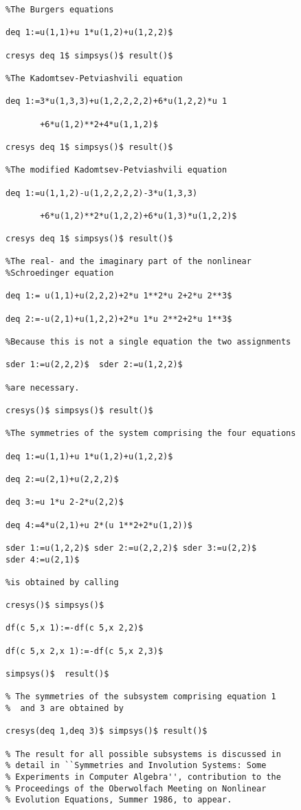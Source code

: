 \begin{verbatim}
%The Burgers equations

deq 1:=u(1,1)+u 1*u(1,2)+u(1,2,2)$

cresys deq 1$ simpsys()$ result()$

%The Kadomtsev-Petviashvili equation

deq 1:=3*u(1,3,3)+u(1,2,2,2,2)+6*u(1,2,2)*u 1

       +6*u(1,2)**2+4*u(1,1,2)$

cresys deq 1$ simpsys()$ result()$

%The modified Kadomtsev-Petviashvili equation

deq 1:=u(1,1,2)-u(1,2,2,2,2)-3*u(1,3,3)

       +6*u(1,2)**2*u(1,2,2)+6*u(1,3)*u(1,2,2)$

cresys deq 1$ simpsys()$ result()$

%The real- and the imaginary part of the nonlinear
%Schroedinger equation

deq 1:= u(1,1)+u(2,2,2)+2*u 1**2*u 2+2*u 2**3$

deq 2:=-u(2,1)+u(1,2,2)+2*u 1*u 2**2+2*u 1**3$

%Because this is not a single equation the two assignments

sder 1:=u(2,2,2)$  sder 2:=u(1,2,2)$

%are necessary.

cresys()$ simpsys()$ result()$

%The symmetries of the system comprising the four equations

deq 1:=u(1,1)+u 1*u(1,2)+u(1,2,2)$

deq 2:=u(2,1)+u(2,2,2)$

deq 3:=u 1*u 2-2*u(2,2)$

deq 4:=4*u(2,1)+u 2*(u 1**2+2*u(1,2))$

sder 1:=u(1,2,2)$ sder 2:=u(2,2,2)$ sder 3:=u(2,2)$
sder 4:=u(2,1)$

%is obtained by calling

cresys()$ simpsys()$

df(c 5,x 1):=-df(c 5,x 2,2)$

df(c 5,x 2,x 1):=-df(c 5,x 2,3)$

simpsys()$  result()$

% The symmetries of the subsystem comprising equation 1
%  and 3 are obtained by

cresys(deq 1,deq 3)$ simpsys()$ result()$

% The result for all possible subsystems is discussed in
% detail in ``Symmetries and Involution Systems: Some
% Experiments in Computer Algebra'', contribution to the
% Proceedings of the Oberwolfach Meeting on Nonlinear
% Evolution Equations, Summer 1986, to appear.
\end{verbatim}
